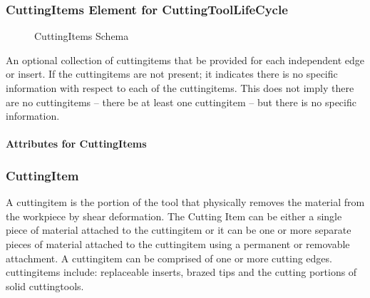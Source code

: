 \subsubsection{CuttingItems Element for CuttingToolLifeCycle}

\begin{figure}[ht]
  \centering
  \caption{CuttingItems Schema}
  \label{fig:cuttingitems-schema}
\end{figure}

\FloatBarrier

An optional collection of \glspl{cuttingitem} that \SHOULD be provided for each independent edge or insert.  If the \glspl{cuttingitem} are not present; it indicates there is no specific information with respect to each of the \glspl{cuttingitem}.  This does not imply there are no \glspl{cuttingitem} – there \MUST be at least one \gls{cuttingitem} – but there is no specific information.

\paragraph{Attributes for CuttingItems}\mbox{}




\subsubsection{CuttingItem}

A \gls{cuttingitem} is the portion of the tool that physically removes the material from the workpiece by shear deformation.  The Cutting Item can be either a single piece of material attached to the \gls{cuttingitem} or it can be one or more separate pieces of material attached to the \gls{cuttingitem} using a permanent or removable attachment.  A \gls{cuttingitem} can be comprised of one or more cutting edges.  \glspl{cuttingitem} include: replaceable inserts, brazed tips and the cutting portions of solid \glspl{cuttingtool}.

